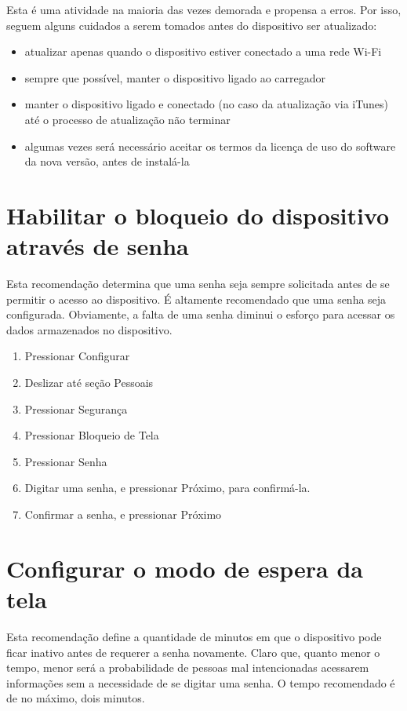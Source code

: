 Esta \'e uma atividade na maioria das vezes demorada e propensa a erros. Por isso, seguem alguns cuidados a serem tomados antes do dispositivo ser atualizado:

\begin{itemize}
\item atualizar apenas quando o dispositivo estiver conectado a uma rede Wi-Fi
\item sempre que poss\'ivel, manter o dispositivo ligado ao carregador
\item manter o dispositivo ligado e conectado (no caso da atualiza\c c\~ao via iTunes) at\'e o processo de atualiza\c c\~ao n\~ao terminar
\item algumas vezes será necess\'ario aceitar os termos da licen\c ca de uso do software da nova vers\~ao, antes de instal\'a-la
\end{itemize}

\section{Habilitar o bloqueio do dispositivo atrav\'es de senha} \label{senha}

Esta recomenda\c c\~ao determina que uma senha seja sempre solicitada antes de se permitir o acesso ao dispositivo. \'E altamente recomendado que uma senha seja configurada. Obviamente, a falta de uma senha diminui o esfor\c co para acessar os dados armazenados no dispositivo.

\begin{enumerate}
\item Pressionar Configurar
\item Deslizar at\'e se\c c\~ao Pessoais
\item Pressionar Seguran\c ca
\item Pressionar Bloqueio de Tela
\item Pressionar Senha
\item Digitar uma senha, e pressionar Pr\'oximo, para confirm\'a-la.
\item Confirmar a senha, e pressionar Pr\'oximo
\end{enumerate}

\section{Configurar o modo de espera da tela}

Esta recomenda\c c\~ao define a quantidade de minutos em que o dispositivo pode ficar inativo antes de requerer a senha novamente. Claro que, quanto menor o tempo, menor ser\'a a probabilidade de pessoas mal intencionadas acessarem informa\c c\~oes sem a necessidade de se digitar uma senha. O tempo recomendado \'e de no m\'aximo, dois minutos.

